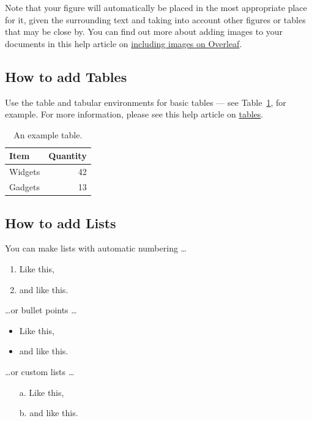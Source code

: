 \documentclass[12pt,a4paper,faculty=ea,language=en,doctype=article]{ugent-doc}
\begin{document}
Note that your figure will automatically be placed in the most appropriate place for it, given the surrounding text and taking into account other figures or tables that may be close by.
You can find out more about adding images to your documents in this help article on \href{https://www.overleaf.com/learn/how-to/Including_images_on_Overleaf}{including images on Overleaf}.


\subsection{How to add Tables}

Use the table and tabular environments for basic tables --- see Table~\ref{tab:widgets}, for example.
For more information, please see this help article on \href{https://www.overleaf.com/learn/latex/tables}{tables}. 

\begin{table}[h]
\centering
    \begin{tabular}{l|r}
        Item & Quantity \\\hline
        Widgets & 42 \\
        Gadgets & 13
    \end{tabular}
    \caption{\label{tab:widgets}An example table.}
\end{table}


\subsection{How to add Lists}

You can make lists with automatic numbering \dots

\begin{enumerate}
    \item Like this,
    \item and like this.
\end{enumerate}
\dots or bullet points \dots
\begin{itemize}
    \item Like this,
    \item and like this.
\end{itemize}
\dots or custom lists \dots
\begin{itemize}
    \item[a.] Like this,
    \item[b.] and like this.
\end{itemize}
\end{document}
